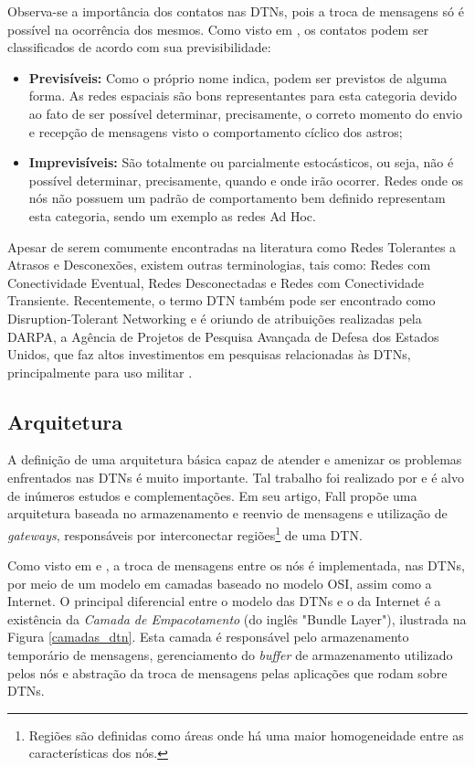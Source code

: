 Observa-se a importância dos contatos nas DTNs, pois a troca de mensagens só é possível na ocorrência dos mesmos. Como visto em \cite{rfc4838}, os contatos podem ser classificados de acordo com sua previsibilidade:

\begin{itemize}
    \item \textbf{Previsíveis:} Como o próprio nome indica, podem ser previstos de alguma forma. As redes espaciais são bons representantes para esta categoria devido ao fato de ser possível determinar, precisamente, o correto momento do envio e recepção de mensagens visto o comportamento cíclico dos astros;
    \item \textbf{Imprevisíveis:} São totalmente ou parcialmente estocásticos, ou seja, não é possível determinar, precisamente, quando e onde irão ocorrer. Redes onde os nós não possuem um padrão de comportamento bem definido representam esta categoria, sendo um exemplo as redes Ad Hoc.
\end{itemize}


Apesar de serem comumente encontradas na literatura como Redes Tolerantes a Atrasos e Desconexões, existem outras terminologias, tais como: Redes com Conectividade Eventual, Redes Desconectadas e Redes com Conectividade Transiente. Recentemente, o termo DTN também pode ser encontrado como Disruption-Tolerant Networking e é oriundo de atribuições realizadas pela DARPA, a Agência de Projetos de Pesquisa Avançada de Defesa dos Estados Unidos, que faz altos investimentos em pesquisas relacionadas às DTNs, principalmente para uso militar \cite{krishnan2007spindle, sehl2013viability}.

\newpage
\subsection{Arquitetura}

A definição de uma arquitetura básica capaz de atender e amenizar os problemas enfrentados nas DTNs é muito importante. Tal trabalho foi realizado por \cite{fall2003delay} e é alvo de inúmeros estudos e complementações. Em seu artigo, Fall propõe uma arquitetura baseada no armazenamento e reenvio de mensagens e utilização de \emph{gateways}, responsáveis por interconectar regiões\footnote{Regiões são definidas como áreas onde há uma maior homogeneidade entre as características dos nós.} de uma DTN.

Como visto em \cite{rfc5050} e \cite{umrKehr}, a troca de mensagens entre os nós é implementada, nas DTNs, por meio de um modelo em camadas baseado no modelo OSI, assim como a Internet. O principal diferencial entre o modelo das DTNs e o da Internet é a existência da \emph{Camada de Empacotamento} (do inglês "Bundle Layer"), ilustrada na Figura \ref{camadas_dtn}. Esta camada é responsável pelo armazenamento temporário de mensagens, gerenciamento do \emph{buffer} de armazenamento utilizado pelos nós e abstração da troca de mensagens pelas aplicações que rodam sobre DTNs.

